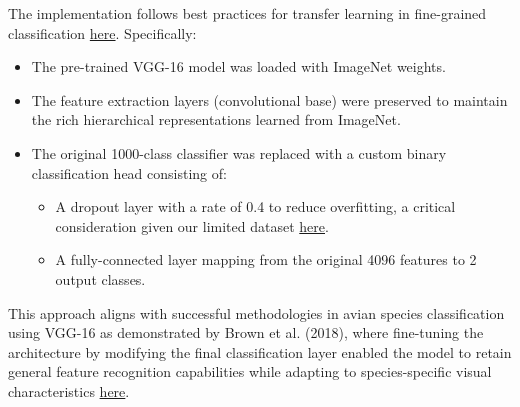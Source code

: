 \documentclass[a4paper,12pt]{article}
\begin{document}


The implementation follows best practices for transfer learning in fine-grained classification \href{https://openaccess.thecvf.com/content_CVPR_2019/papers/Kornblith_Do_Better_ImageNet_Models_Transfer_Better_CVPR_2019_paper.pdf}{here}. Specifically:
\begin{itemize}
    \item The pre-trained VGG-16 model was loaded with ImageNet weights.
    \item The feature extraction layers (convolutional base) were preserved to maintain the rich hierarchical representations learned from ImageNet.
    \item The original 1000-class classifier was replaced with a custom binary classification head consisting of: 
    \begin{itemize}
        \item A dropout layer with a rate of 0.4 to reduce overfitting, a critical consideration given our limited dataset \href{https://www.jmlr.org/papers/volume15/srivastava14a/srivastava14a.pdf}{here}.
        \item A fully-connected layer mapping from the original 4096 features to 2 output classes.
    \end{itemize}
\end{itemize}

This approach aligns with successful methodologies in avian species classification using VGG-16 as demonstrated by Brown et al. (2018), where fine-tuning the architecture by modifying the final classification layer enabled the model to retain general feature recognition capabilities while adapting to species-specific visual characteristics \href{https://ieeexplore.ieee.org/stamp/stamp.jsp?tp=&arnumber=10533638&tag=}{here}.
\end{document}

